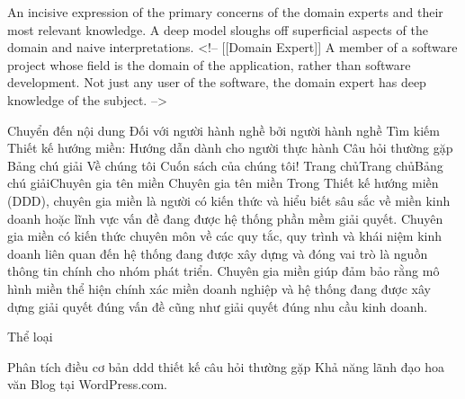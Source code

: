 
An incisive expression of the primary concerns of the domain experts and their most relevant knowledge. A deep model sloughs off superficial aspects of the domain and naive interpretations.
<!-- [[Domain Expert]] A member of a software project whose field is the domain of the application, rather than software development. Not just any user of the software, the domain expert has deep knowledge of the subject. -->



Chuyển đến nội dung
Đối với người hành nghề bởi người hành nghề
Tìm kiếm
Thiết kế hướng miền: Hướng dẫn dành cho người thực hành
Câu hỏi thường gặp
Bảng chú giải
Về chúng tôi
Cuốn sách của chúng tôi!
Trang chủTrang chủBảng chú giảiChuyên gia tên miền
Chuyên gia tên miền
Trong Thiết kế hướng miền (DDD), chuyên gia miền là người có kiến ​​thức và hiểu biết sâu sắc về miền kinh doanh hoặc lĩnh vực vấn đề đang được hệ thống phần mềm giải quyết. Chuyên gia miền có kiến ​​thức chuyên môn về các quy tắc, quy trình và khái niệm kinh doanh liên quan đến hệ thống đang được xây dựng và đóng vai trò là nguồn thông tin chính cho nhóm phát triển. Chuyên gia miền giúp đảm bảo rằng mô hình miền thể hiện chính xác miền doanh nghiệp và hệ thống đang được xây dựng giải quyết đúng vấn đề cũng như giải quyết đúng nhu cầu kinh doanh.


Thể loại

Phân tích
điều cơ bản
ddd
thiết kế
câu hỏi thường gặp
Khả năng lãnh đạo
hoa văn
Blog tại WordPress.com.